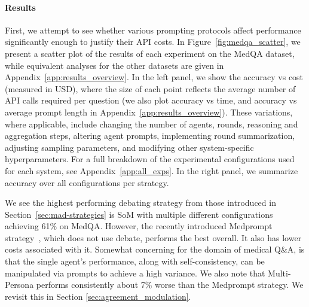 \documentclass{article}  %
\newcommand{\ngr}[1]{{\color{blue}[Nathan: #1]}}
\begin{document}
\paragraph{Results}
First, we attempt to see whether various prompting protocols affect performance significantly enough to justify their API costs. In Figure~\ref{fig:medqa_scatter}, we present a scatter plot of the results of each experiment on the MedQA dataset, while equivalent analyses for the other datasets are given in Appendix~\ref{app:results_overview}.
In the left panel, we show the accuracy vs cost (measured in USD), where the size of each point reflects the average number of API calls required per question (we also plot accuracy vs time, and accuracy vs average prompt length in Appendix~\ref{app:results_overview}). These variations, where applicable, include changing the number of agents, rounds, reasoning and aggregation steps, altering agent prompts, implementing round summarization, adjusting sampling parameters, and modifying other system-specific hyperparameters. For a full breakdown of the experimental configurations used for each system, see Appendix~\ref{app:all_exps}. %
In the right panel, we summarize accuracy over all configurations per strategy. 

We see the highest performing debating strategy from those introduced in Section~\ref{sec:mad-strategies} is SoM with multiple different configurations achieving 61\% on MedQA. However, the recently introduced Medprompt strategy~\cite{nori2023medprompt}, which does not use debate, performs the best overall. It also has lower costs associated with it.
Somewhat concerning for the domain of medical Q\&A, is that the single agent's performance, along with self-consistency, can be manipulated via prompts to achieve a high variance. 
We also note that Multi-Persona performs consistently about 7\% worse than the Medprompt strategy. We revisit this in Section \ref{sec:agreement_modulation}.
\end{document}
